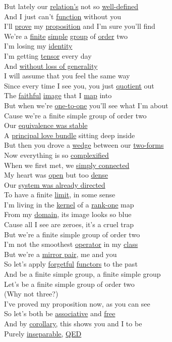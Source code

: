 \documentclass[11pt,paper=letter]{scrartcl}
\makeatletter
\newcommand\@wo[2][]{\hyperref[w:#1]{#2}}
\newcommand\wo{\@dblarg\@wo}
\makeatother
\begin{document}
\noindent
But lately our \wo[relation]{relation's} not so \wo{well-defined} \\
And I just can't \wo{function} without you \\
I'll \wo[prove]{prove} my \wo{proposition} and I'm sure you'll find \\
We're a \wo{finite} \wo[simple group]{simple} \wo{group} of \wo{order} two \\

\noindent
I'm losing my \wo{identity} \\
I'm getting \wo{tensor} every day \\
And \wo{without loss of generality} \\
I will assume that you feel the same way \\

\noindent
Since every time I see you, you just \wo{quotient} out \\
The \wo{faithful} \wo{image} that I \wo{map} into \\
But when we're \wo{one-to-one} you'll see what I'm about \\
Cause we're a finite simple group of order two \\

\noindent
Our \wo[stable equivalence]{equivalence was stable} \\
A \wo[principal bundle]{principal love bundle} sitting deep inside \\
But then you drove a \wo{wedge} between our \wo[form]{two-forms} \\
Now everything is so \wo[complexification]{complexified} \\

\noindent
When we first met, we \wo{simply connected} \\
My heart was \wo{open} but too \wo{dense} \\
Our \wo[directed system]{system was already directed} \\
To have a finite \wo{limit}, in some sense \\

\noindent
I'm living in the \wo{kernel} of a \wo[rank]{rank-one} map \\
From my \wo{domain}, its image looks so blue \\
Cause all I see are zeroes, it's a cruel trap \\
But we're a finite simple group of order two \\

\noindent
I'm not the smoothest \wo{operator} in my \wo{class} \\
But we're a \wo{mirror pair}, me and you \\
So let's apply \wo{forgetful} \wo[functor]{functors} to the past \\
And be a finite simple group, a finite simple group \\
Let's be a finite simple group of order two \\
(Why not three?) \\

\noindent
I've proved my proposition now, as you can see \\
So let's both be \wo{associative} and \wo{free} \\
And by \wo[corollary]{corollary,} this shows you and I to be \\
Purely \wo[separable]{inseparable,} \wo{QED} \\
\end{document}
